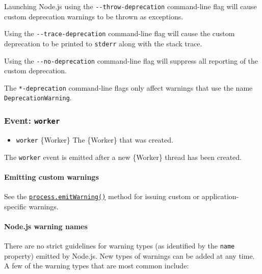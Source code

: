 Launching Node.js using the \texttt{-\/-throw-deprecation} command-line
flag will cause custom deprecation warnings to be thrown as exceptions.

Using the \texttt{-\/-trace-deprecation} command-line flag will cause
the custom deprecation to be printed to \texttt{stderr} along with the
stack trace.

Using the \texttt{-\/-no-deprecation} command-line flag will suppress
all reporting of the custom deprecation.

The \texttt{*-deprecation} command-line flags only affect warnings that
use the name
\texttt{\textquotesingle{}DeprecationWarning\textquotesingle{}}.

\subsubsection{\texorpdfstring{Event:
\texttt{\textquotesingle{}worker\textquotesingle{}}}{Event: \textquotesingle worker\textquotesingle{}}}\label{event-worker}

\begin{itemize}
\tightlist
\item
  \texttt{worker} \{Worker\} The \{Worker\} that was created.
\end{itemize}

The \texttt{\textquotesingle{}worker\textquotesingle{}} event is emitted
after a new \{Worker\} thread has been created.

\paragraph{Emitting custom warnings}\label{emitting-custom-warnings}

See the
\hyperref[processemitwarningwarning-type-code-ctor]{\texttt{process.emitWarning()}}
method for issuing custom or application-specific warnings.

\paragraph{Node.js warning names}\label{node.js-warning-names}

There are no strict guidelines for warning types (as identified by the
\texttt{name} property) emitted by Node.js. New types of warnings can be
added at any time. A few of the warning types that are most common
include:

